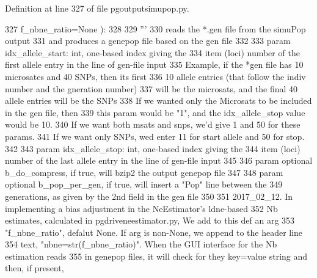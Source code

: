 Definition at line 327 of file pgoutputsimupop.\+py.


\begin{DoxyCode}
327             f\_nbne\_ratio=\textcolor{keywordtype}{None} ):
328 
329         \textcolor{stringliteral}{'''}
330 \textcolor{stringliteral}{        reads the *.gen file from the simuPop output}
331 \textcolor{stringliteral}{        and produces a genepop file based on the gen file}
332 \textcolor{stringliteral}{}
333 \textcolor{stringliteral}{        param idx\_allele\_start: int, one-based index giving the}
334 \textcolor{stringliteral}{        item (loci) number of the first allele entry in the line of gen-file input}
335 \textcolor{stringliteral}{        Example, if the *gen file has 10 microsates and 40 SNPs, then its first}
336 \textcolor{stringliteral}{        10 allele entries (that follow the indiv number and the gneration number)}
337 \textcolor{stringliteral}{        will be the microsats, and the final 40 allele entries will be the SNPs}
338 \textcolor{stringliteral}{        If we wanted only the Microsats to be included in the gen file, then}
339 \textcolor{stringliteral}{        this param would be "1", and the idx\_allele\_stop value would be 10. }
340 \textcolor{stringliteral}{        If we want both msats and snps, we'd give 1 and 50 for these params. }
341 \textcolor{stringliteral}{        If we want only SNPs, wed enter 11 for start allele and 50 for stop.}
342 \textcolor{stringliteral}{}
343 \textcolor{stringliteral}{        param idx\_allele\_stop: int, one-based index giving the}
344 \textcolor{stringliteral}{        item (loci) number of the last allele entry in the line of gen-file input}
345 \textcolor{stringliteral}{}
346 \textcolor{stringliteral}{        param optional b\_do\_compress, if true, will bzip2 the output genepop file}
347 \textcolor{stringliteral}{}
348 \textcolor{stringliteral}{        param optional b\_pop\_per\_gen, if true, will insert a "Pop" line between the}
349 \textcolor{stringliteral}{        generations, as given by the 2nd field in the gen file}
350 \textcolor{stringliteral}{}
351 \textcolor{stringliteral}{        2017\_02\_12.  In implementing a bias adjustment in the NeEstimator's ldne-based}
352 \textcolor{stringliteral}{        Nb estimates, calculated in pgdriveneestimator.py, We add to this def an arg }
353 \textcolor{stringliteral}{        "f\_nbne\_ratio", defalut None.  If arg is non-None, we append to the header line }
354 \textcolor{stringliteral}{        text, "nbne=str(f\_nbne\_ratio)". When the GUI interface for the Nb estimation reads}
355 \textcolor{stringliteral}{        in genepop files, it will check for they key=value string and then, if present,}

\end{DoxyCode}
